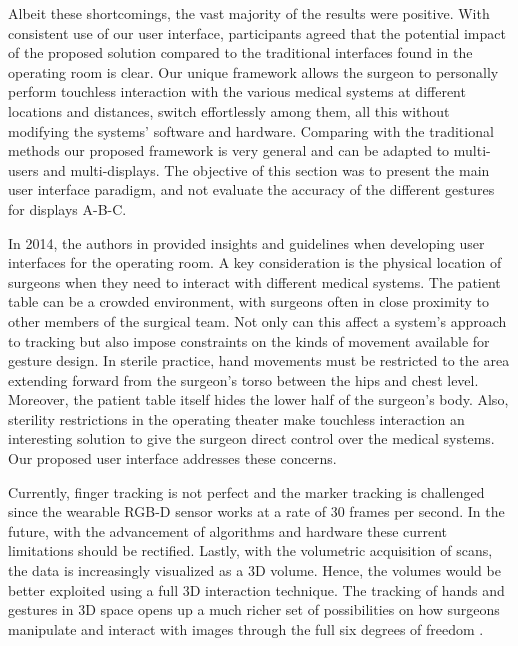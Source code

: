 Albeit these shortcomings, the vast majority of the results were positive. With consistent use of our user interface, participants agreed that the potential impact of the proposed solution compared to the traditional interfaces found in the operating room is clear. Our unique framework allows the surgeon to personally perform touchless interaction with the various medical systems at different locations and distances, switch effortlessly among them, all this without modifying the systems’ software and hardware. Comparing with the traditional methods our proposed framework is very general and can be adapted to multi-users and multi-displays. The objective of this section was to present the main user interface paradigm, and not evaluate the accuracy of the different gestures for displays A-B-C.

In 2014, the authors in \cite{Pederson2010} provided insights and guidelines when developing user interfaces for the operating room. A key consideration is the physical location of surgeons when they need to interact with different medical systems. The patient table can be a crowded environment, with surgeons often in close proximity to other members of the surgical team. Not only can this affect a system’s approach to tracking but also impose constraints on the kinds of movement available for gesture design. In sterile practice, hand movements must be restricted to the area extending forward from the surgeon's torso between the hips and chest level. Moreover, the patient table itself hides the lower half of the surgeon's body. Also, sterility restrictions in the operating theater make touchless interaction an interesting solution to give the surgeon direct control over the medical systems. Our proposed user interface addresses these concerns.

Currently, finger tracking is not perfect and the marker tracking is challenged since the wearable RGB-D sensor works at a rate of 30 frames per second. In the future, with the advancement of algorithms and hardware these current limitations should be rectified.
Lastly, with the volumetric acquisition of scans, the data is increasingly visualized as a 3D volume. Hence, the volumes would be better exploited using a full 3D interaction technique. The tracking of hands and gestures in 3D space opens up a much richer set of possibilities on how surgeons manipulate and interact with images through the full six degrees of freedom \cite{Pederson2010}.

